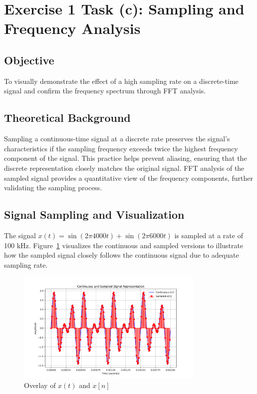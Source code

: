 
\item[(c)]
\section*{Exercise 1 Task (c): Sampling and Frequency Analysis}

\subsection*{Objective}
To visually demonstrate the effect of a high sampling rate on a discrete-time signal and confirm the frequency spectrum through FFT analysis.

\subsection*{Theoretical Background}
Sampling a continuous-time signal at a discrete rate preserves the signal's characteristics if the sampling frequency exceeds twice the highest frequency component of the signal.
This practice helps prevent aliasing, ensuring that the discrete representation closely matches the original signal.
FFT analysis of the sampled signal provides a quantitative view of the frequency components, further validating the sampling process.

\subsection*{Signal Sampling and Visualization}
The signal $x(t) = \sin(2\pi 4000t) + \sin(2\pi 6000t)$ is sampled at a rate of 100 kHz.
Figure~\ref{fig:ex1c_signal_sampling} visualizes the continuous and sampled versions to illustrate how the sampled signal closely follows the continuous signal due to adequate sampling rate.

\begin{figure}[h]
    \centering
    \includegraphics[width=0.8\textwidth]{fig/ex1_c_plot}
    \caption{Overlay of $x(t)$ and $x[n]$}
    \label{fig:ex1c_signal_sampling}
\end{figure}

